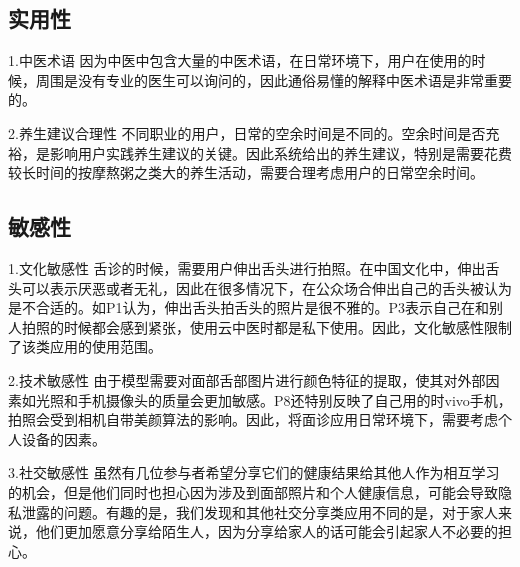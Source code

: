 \subsection{实用性}
1.中医术语
 因为中医中包含大量的中医术语，在日常环境下，用户在使用的时候，周围是没有专业的医生可以询问的，因此通俗易懂的解释中医术语是非常重要的。
 
2.养生建议合理性
不同职业的用户，日常的空余时间是不同的。空余时间是否充裕，是影响用户实践养生建议的关键。因此系统给出的养生建议，特别是需要花费较长时间的按摩熬粥之类大的养生活动，需要合理考虑用户的日常空余时间。
\subsection{敏感性}
1.文化敏感性
舌诊的时候，需要用户伸出舌头进行拍照。在中国文化中，伸出舌头可以表示厌恶或者无礼，因此在很多情况下，在公众场合伸出自己的舌头被认为是不合适的。如P1认为，伸出舌头拍舌头的照片是很不雅的。P3表示自己在和别人拍照的时候都会感到紧张，使用云中医时都是私下使用。因此，文化敏感性限制了该类应用的使用范围。

2.技术敏感性
由于模型需要对面部舌部图片进行颜色特征的提取，使其对外部因素如光照和手机摄像头的质量会更加敏感。P8还特别反映了自己用的时vivo手机，拍照会受到相机自带美颜算法的影响。因此，将面诊应用日常环境下，需要考虑个人设备的因素。

3.社交敏感性
虽然有几位参与者希望分享它们的健康结果给其他人作为相互学习的机会，但是他们同时也担心因为涉及到面部照片和个人健康信息，可能会导致隐私泄露的问题。有趣的是，我们发现和其他社交分享类应用不同的是，对于家人来说，他们更加愿意分享给陌生人，因为分享给家人的话可能会引起家人不必要的担心。
